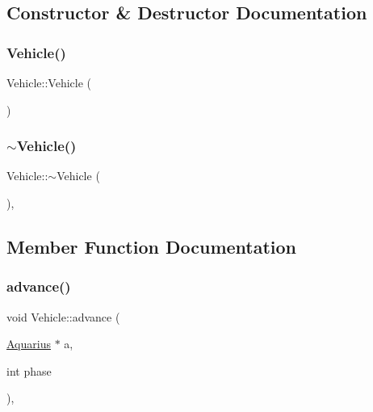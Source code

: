 \subsection{Constructor \& Destructor Documentation}
\mbox{\label{classVehicle_abaad8187d9f2ede4fb8ea18de0a6764c_abaad8187d9f2ede4fb8ea18de0a6764c}} 
\subsubsection{\texorpdfstring{Vehicle()}{Vehicle()}}
{\footnotesize\ttfamily Vehicle\+::\+Vehicle (\begin{DoxyParamCaption}{ }\end{DoxyParamCaption})}

\mbox{\label{classVehicle_a61ab140c755b8e0e824d54117cf4546f_a61ab140c755b8e0e824d54117cf4546f}} 
\subsubsection{\texorpdfstring{$\sim$\+Vehicle()}{~Vehicle()}}
{\footnotesize\ttfamily Vehicle\+::$\sim$\+Vehicle (\begin{DoxyParamCaption}{ }\end{DoxyParamCaption})\hspace{0.3cm}{\ttfamily [virtual]}, {\ttfamily [default]}}



\subsection{Member Function Documentation}
\mbox{\label{classVehicle_aa4ffd7e5fd11297950347de4e8b5ec93_aa4ffd7e5fd11297950347de4e8b5ec93}} 
\subsubsection{\texorpdfstring{advance()}{advance()}}
{\footnotesize\ttfamily void Vehicle\+::advance (\begin{DoxyParamCaption}\item[{\hyperlink{classAquarius}{Aquarius} $\ast$}]{a,  }\item[{int}]{phase }\end{DoxyParamCaption})\hspace{0.3cm}{\ttfamily [final]}, {\ttfamily [virtual]}}

